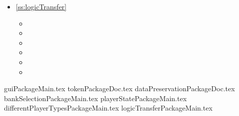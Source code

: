 \begin{multicols}{2}
\begin{itemize}
	\item \ref{ss:logicTransfer} 
	\begin{itemize}
		\item {}
		\item {}
		\item {}		
		\item {}
		\item {}		
		\item {}
	\end{itemize}
\end{itemize}
\end{multicols}

\clearpage
{guiPackageMain.tex}
\clearpage
{tokenPackageDoc.tex}
\clearpage
{dataPreservationPackageDoc.tex}
\clearpage
{bankSelectionPackageMain.tex}
\clearpage
{playerStatePackageMain.tex}
\clearpage
{differentPlayerTypesPackageMain.tex}
\clearpage
{logicTransferPackageMain.tex}
